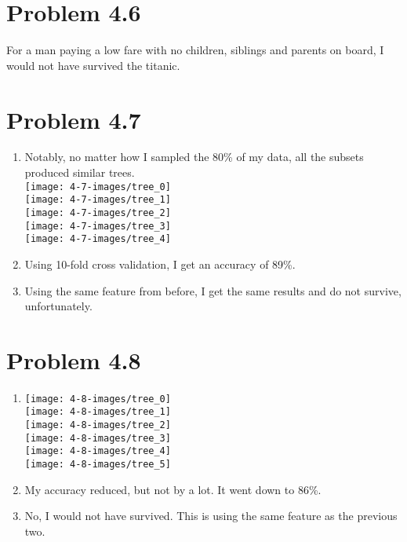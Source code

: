 \documentclass{article}
\begin{document}
\section*{Problem 4.6}
For a man paying a low fare with no children, siblings and parents on board, I would not have survived the titanic.

\section*{Problem 4.7}
\begin{enumerate}[label=(\alph*)]
  \item Notably, no matter how I sampled the 80\% of my data, all the subsets produced similar trees. \\
  \texttt{[image: 4-7-images/tree\_0]} \\
  \texttt{[image: 4-7-images/tree\_1]} \\
  \texttt{[image: 4-7-images/tree\_2]} \\
  \texttt{[image: 4-7-images/tree\_3]} \\
  \texttt{[image: 4-7-images/tree\_4]}
  \item Using 10-fold cross validation, I get an accuracy of 89\%.
  \item Using the same feature from before, I get the same results and do not survive, unfortunately.
\end{enumerate}

\section*{Problem 4.8}
\begin{enumerate}[label=(\alph*)]
  \item
  \texttt{[image: 4-8-images/tree\_0]} \\
  \texttt{[image: 4-8-images/tree\_1]} \\
  \texttt{[image: 4-8-images/tree\_2]} \\
  \texttt{[image: 4-8-images/tree\_3]} \\
  \texttt{[image: 4-8-images/tree\_4]} \\
  \texttt{[image: 4-8-images/tree\_5]}
  \item My accuracy reduced, but not by a lot. It went down to 86\%.
  \item No, I would not have survived. This is using the same feature as the previous two.
\end{enumerate}
\end{document}
